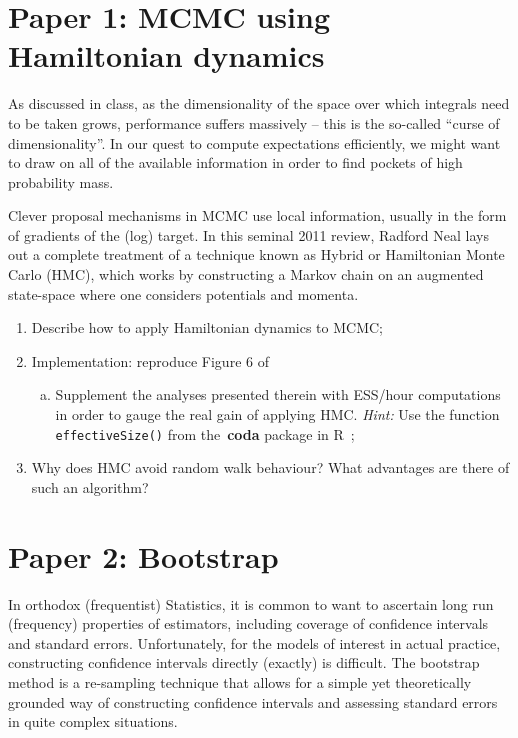 \documentclass[a4paper,10pt, notitlepage]{report}
\begin{document}
\newpage 

\section*{Paper 1: MCMC using Hamiltonian dynamics~\citep{Neal2011}}

As discussed in class, as the dimensionality of the space over which integrals need to be taken grows, performance suffers massively -- this is the so-called ``curse of dimensionality''.
In our quest to compute expectations efficiently, we might want to draw on all of the available information in order to find pockets of high probability mass. 

Clever proposal mechanisms in MCMC use local information, usually in the form of gradients of the (log) target.
In this seminal 2011 review, Radford Neal lays out a complete treatment of a technique known as Hybrid or Hamiltonian Monte Carlo  (HMC), which works by constructing a Markov chain on an augmented state-space where one considers potentials and momenta.

\begin{enumerate}
 \item Describe how to apply Hamiltonian dynamics to MCMC;
 \item Implementation: reproduce Figure 6 of~\cite{Neal2011}
\begin{enumerate}[(a)]
  \item Supplement the analyses presented therein with ESS/hour computations in order to gauge the real gain of applying HMC.
  \textit{Hint:} Use the function \verb|effectiveSize()| from the~\textbf{coda} package in R~\citep{Plummer2006};
 \end{enumerate} 
 \item Why does HMC avoid random walk behaviour? What advantages are there of such an algorithm?
\end{enumerate}

\section*{Paper 2: Bootstrap~\citep{Efron1986}}

In orthodox (frequentist) Statistics, it is common to want to ascertain long run (frequency) properties of estimators, including coverage of confidence intervals and standard errors.
Unfortunately, for the models of interest in actual practice, constructing confidence intervals directly (exactly) is difficult.
The bootstrap method is a re-sampling technique that allows for a simple yet theoretically grounded way of constructing confidence intervals and assessing standard errors in quite complex situations.
\end{document}
